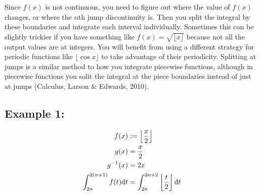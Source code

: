 \documentclass[12pt]{article}
\begin{document}
	\indent\indent Since $f(x)$ is not continuous, you need to figure out where the value of $f(x)$ changes,
	or where the $n$th jump discontinuity is. Then you split the integral by these boundaries and integrate
	each interval individually. Sometimes this can be slightly trickier if you have something like
	$f(x)=\sqrt{\lfloor x\rfloor}$ because not all the output values are at integers. You will benefit from
	using a different strategy for periodic functions like $\lfloor\cos x\rfloor$ to take advantage of
	their periodicity. Splitting at jumps is a similar method to how you integrate piecewise functions,
	although in piecewise functions you solit the integral at the piece boundaries instead of just at jumps
	(Calculus, Larson \& Edwards, 2010).

	\subsection*{Example 1:}

		\begin{minipage}{0.5\textwidth}
			\begin{align*}
				f(x) & := \left\lfloor\frac x2\right\rfloor\\
				g(x) & = \frac x2\\
				g^{-1}(x) & = 2x\\
				\int_{2n}^{2(n+1)}f(t)\text dt & = \int_{2n}^{2n+2}\left\lfloor\frac t2\right\rfloor\text dt
			\end{align*}
		\end{minipage}
		\hfill
		\begin{minipage}{0.5\textwidth}
		\end{minipage}
		\vspace{0.2em}
\end{document}
